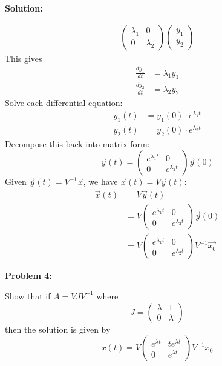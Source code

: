 \documentclass[12pt]{article}
\newenvironment{problem}[1]{
    \textbf{Problem #1:}
}{
    \rmfamily \vspace{1em}
}
\newenvironment{solution}{
    \textbf{Solution:}
    
}{
    
    \vspace{2em}
}
\begin{document}
\begin{solution}
\[\begin{aligned}
\begin{pmatrix}
                \lambda_1 & 0 \\
                0 & \lambda_2
            \end{pmatrix} \begin{pmatrix}
                y_1 \\
                y_2
            \end{pmatrix}
        \end{aligned}
    \]
    This gives
    \[
        \begin{aligned}
            \frac{dy_1}{dt} &= \lambda_1 y_1 \\
            \frac{dy_2}{dt} &= \lambda_2 y_2
        \end{aligned}
    \]
    Solve each differential equation:
    \[
        \begin{aligned}
            y_1(t) &= y_1(0) \cdot e^{\lambda_1 t} \\
            y_2(t) &= y_2(0) \cdot e^{\lambda_2 t}
        \end{aligned}
    \]
    Decompose this back into matrix form:
    \[
        \vec{y}(t) = \begin{pmatrix}
            e^{\lambda_1 t} & 0 \\
            0 & e^{\lambda_2 t}
        \end{pmatrix} \vec{y}(0)
    \]
    Given \(\vec{y}(t) = V^{-1}\vec{x}\), we have \(\vec{x}(t) = V\vec{y}(t)\):
    \[
        \begin{aligned}
            \vec{x}(t) &= V\vec{y}(t) \\
            &= V\begin{pmatrix}
                e^{\lambda_1 t} & 0 \\
            0 & e^{\lambda_2 t}
        \end{pmatrix}\vec{y}(0) \\
        &= V\begin{pmatrix}
            e^{\lambda_1 t} & 0 \\
            0 & e^{\lambda_2 t}
        \end{pmatrix}V^{-1}\vec{x_0}
        \end{aligned}
    \]
\end{solution}

\begin{problem}{4}
    Show that if \(A = VJV^{-1}\) where
    \[
        J = \begin{pmatrix}
            \lambda & 1 \\
            0 & \lambda
        \end{pmatrix}
    \]
    then the solution is given by
    \[
        x(t) = V\begin{pmatrix}
            e^{\lambda t} & t e^{\lambda t} \\
            0 & e^{\lambda t}
        \end{pmatrix}V^{-1}x_0
    \]
\end{problem}
\end{document}
